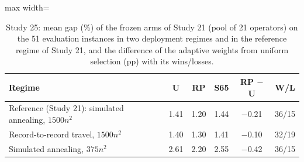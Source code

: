 \begin{table}[t]
\caption{Study 25: mean gap (\%) of the frozen arms of Study 21 (pool of 21 operators) on the 51 evaluation instances in two deployment regimes and in the reference regime of Study 21, and the difference of the adaptive weights from uniform selection (pp) with its wins/losses.}\label{tab:s25a}
\centering
\small
\begin{adjustbox}{max width=\linewidth}
\begin{tabular}{lccccc}
\toprule
Regime & U & RP & S65 & RP $-$ U & W/L \\
\midrule
Reference (Study 21): simulated annealing, $1500n^2$ & 1.41 & 1.20 & 1.44 & $-$0.21 & 36/15 \\
Record-to-record travel, $1500n^2$ & 1.40 & 1.30 & 1.41 & $-$0.10 & 32/19 \\
Simulated annealing, $375n^2$ & 2.61 & 2.20 & 2.55 & $-$0.42 & 36/15 \\
\bottomrule
\end{tabular}
\end{adjustbox}
\end{table}
